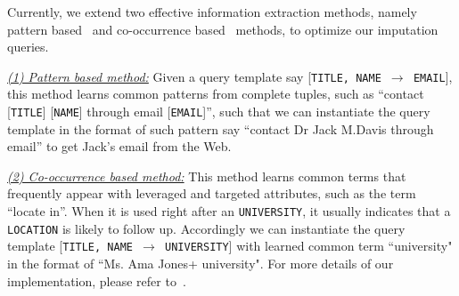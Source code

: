 \documentclass[sigconf]{acmart}
\begin{document}


Currently, we extend two effective information extraction methods, namely pattern based~\cite{hearst1992automatic} and co-occurrence based~\cite{li2014core} methods, to optimize our imputation queries.

\noindent\underline{\it (1) Pattern based method:} Given a query template say [{\tt TITLE, NAME $\to$ EMAIL}], this method learns common patterns from complete tuples, such as ``contact [{\tt TITLE}] [{\tt NAME}] through email [{\tt EMAIL}]'', such that we can instantiate the query template in the format of such pattern say ``contact Dr Jack M.Davis through email'' to get Jack's email from the Web.

\noindent\underline{\it (2) Co-occurrence based method:} This method learns common terms that frequently appear with leveraged and targeted attributes, such as the term ``locate in''. When it is used right after an {\tt UNIVERSITY}, it usually indicates that a {\tt LOCATION} is likely to follow up. Accordingly we can instantiate the query template [{\tt TITLE, NAME $\to$ UNIVERSITY}] with learned common term ``university" in the format of ``Ms. Ama Jones+ university". For more details of our implementation, please refer to~\cite{li2012webput}.

\vspace{-5pt}
\end{document}
